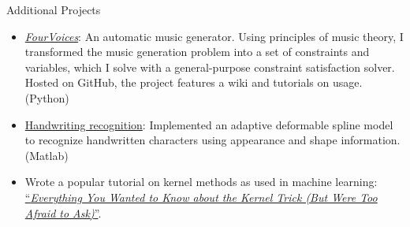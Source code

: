 \documentclass{resume}
\begin{document}
\vspace{-1.0em}

\begin{component}{Additional Projects}
	\begin{itemize}
		\vspace{-0.5em}\item \href{https://github.com/erickim555/FourVoices}{\emph{FourVoices}}: An automatic music generator.
Using principles of music theory, I transformed the music generation problem into a set of constraints and variables, which I solve with a general-purpose constraint satisfaction solver.
Hosted on GitHub, the project features a wiki and tutorials on usage.
		(Python)
        \vspace{-0.5em}\item \href{http://eric-kim.net/cs269\_fa2014/index.html}{Handwriting recognition}:
        Implemented an adaptive deformable spline model to recognize handwritten characters using appearance and shape information.
(Matlab)
            \vspace{-0.5em}\item Wrote a popular tutorial on kernel methods as used in machine learning: \href{http://eric-kim.net/eric-kim-net/posts/1/kernel\_trick\_blog\_ekim\_12\_20\_2017.pdf}{``\emph{Everything You Wanted to Know about the Kernel Trick (But Were Too Afraid to Ask)}''}.

\end{itemize}
\end{component}
\end{document}
